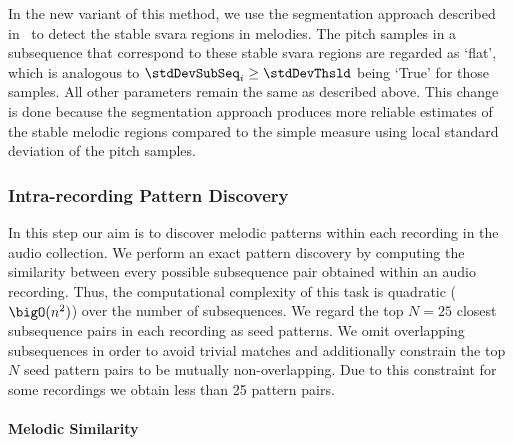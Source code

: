 In the new variant of this method, we use the segmentation approach described in~ to detect the stable \gls{svara} regions in melodies. The pitch samples in a subsequence that correspond to these stable \gls{svara} regions are regarded as `flat', which is analogous to $\stdDevSubSeq_i\geq \stdDevThsld$ being `True' for those samples. All other parameters remain the same as described above. This change is done because the segmentation approach produces more reliable estimates of the stable melodic regions compared to the simple measure using local standard deviation of the pitch samples. 


\subsubsection{Intra-recording Pattern Discovery}
\label{sec:intraRecordingPatternDiscovery}

In this step our aim is to discover melodic patterns within each recording in the audio collection. We perform an exact pattern discovery by computing the similarity between every possible subsequence pair obtained within an audio recording. Thus, the computational complexity of this task is quadratic ($\bigO(n^2)$) over the number of subsequences. We regard the top $N=25$ closest subsequence pairs in each recording as seed patterns. We omit overlapping subsequences in order to avoid trivial matches and additionally constrain the top $N$ seed pattern pairs to be mutually non-overlapping. Due to this constraint for some recordings we obtain less than 25 pattern pairs. 


\paragraph{Melodic Similarity} 


